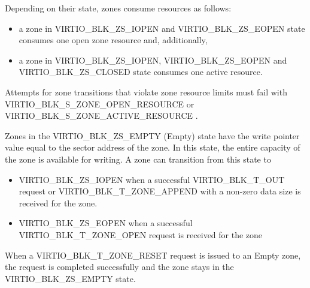Depending on their state, zones consume resources as follows:
\begin{itemize}
\item a zone in VIRTIO_BLK_ZS_IOPEN and VIRTIO_BLK_ZS_EOPEN state consumes one
    open zone resource and, additionally,

\item a zone in VIRTIO_BLK_ZS_IOPEN, VIRTIO_BLK_ZS_EOPEN and
    VIRTIO_BLK_ZS_CLOSED state consumes one active resource.
\end{itemize}

Attempts for zone transitions that violate zone resource limits must fail with
VIRTIO_BLK_S_ZONE_OPEN_RESOURCE or VIRTIO_BLK_S_ZONE_ACTIVE_RESOURCE
.

Zones in the VIRTIO_BLK_ZS_EMPTY (Empty) state have the write pointer value
equal to the sector address of the zone. In this state, the entire capacity of
the zone is available for writing. A zone can transition from this state to
\begin{itemize}
\item VIRTIO_BLK_ZS_IOPEN when a successful VIRTIO_BLK_T_OUT request or
    VIRTIO_BLK_T_ZONE_APPEND with a non-zero data size is received for the zone.

\item VIRTIO_BLK_ZS_EOPEN when a successful VIRTIO_BLK_T_ZONE_OPEN request is
    received for the zone
\end{itemize}

When a VIRTIO_BLK_T_ZONE_RESET request is issued to an Empty zone, the request
is completed successfully and the zone stays in the VIRTIO_BLK_ZS_EMPTY state.


